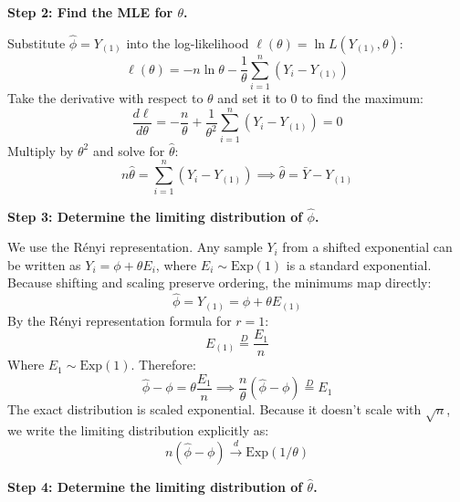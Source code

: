\begin{solution}
\textbf{Step 2: Find the MLE for $\theta$.}

Substitute $\hat{\phi} = Y_{(1)}$ into the log-likelihood $\ell(\theta) = \ln L(Y_{(1)}, \theta)$:
\[ \ell(\theta) = -n \ln \theta - \frac{1}{\theta} \sum_{i=1}^n (Y_i - Y_{(1)}) \]
Take the derivative with respect to $\theta$ and set it to 0 to find the maximum:
\[ \frac{d\ell}{d\theta} = -\frac{n}{\theta} + \frac{1}{\theta^2} \sum_{i=1}^n (Y_i - Y_{(1)}) = 0 \]
Multiply by $\theta^2$ and solve for $\hat{\theta}$:
\[ n \hat{\theta} = \sum_{i=1}^n (Y_i - Y_{(1)}) \implies \hat{\theta} = \bar{Y} - Y_{(1)} \]

\textbf{Step 3: Determine the limiting distribution of $\hat{\phi}$.}

We use the Rényi representation. Any sample $Y_i$ from a shifted exponential can be written as $Y_i = \phi + \theta E_i$, where $E_i \sim \text{Exp}(1)$ is a standard exponential.
Because shifting and scaling preserve ordering, the minimums map directly:
\[ \hat{\phi} = Y_{(1)} = \phi + \theta E_{(1)} \]
By the Rényi representation formula for $r=1$:
\[ E_{(1)} \stackrel{D}{=} \frac{E_1}{n} \]
Where $E_1 \sim \text{Exp}(1)$. Therefore:
\[ \hat{\phi} - \phi = \theta \frac{E_1}{n} \implies \frac{n}{\theta} (\hat{\phi} - \phi) \stackrel{D}{=} E_1 \]
The exact distribution is scaled exponential. Because it doesn't scale with $\sqrt{n}$, we write the limiting distribution explicitly as:
\[ n(\hat{\phi} - \phi) \xrightarrow{d} \text{Exp}(1/\theta) \]

\textbf{Step 4: Determine the limiting distribution of $\hat{\theta}$.}


\end{solution}
